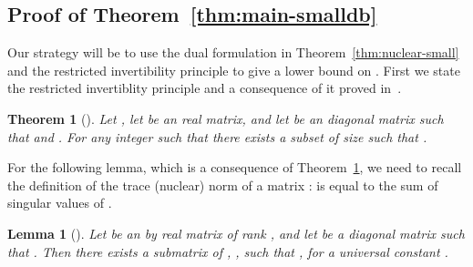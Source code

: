 \documentclass{article}
\newtheorem{theorem}{Theorem}[section]
\newtheorem{lemma}{Lemma}[theorem]
\begin{document}
\subsection{Proof of  Theorem~\ref{thm:main-smalldb}}

Our strategy will be to use the dual formulation in
Theorem~\ref{thm:nuclear-small} and the restricted invertibility
principle to give a lower bound on . First we state the
restricted invertiblity principle and a consequence of it proved in~\cite{apx-disc}.

\begin{theorem}[\cite{bour-tza,bt-constructive}]\label{thm:bt}
  Let , let  be an  real matrix, and
  let  be an  diagonal matrix such that 
  and . For any integer  such that  there exists a subset
   of size  such that
  . 
\end{theorem}

For the following lemma, which is a consequence of
Theorem~\ref{thm:bt}, we need to recall the definition of the trace
(nuclear) norm of a matrix :  is equal to the
sum of singular values of .

\begin{lemma}[\cite{apx-disc}]\label{lm:bt-lb}
  Let  be an  by  real matrix of rank , and let  be a diagonal matrix such that . Then there exists a
  submatrix  of , , such that
  , for a universal constant .
\end{lemma}
\end{document}
